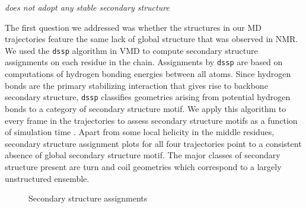 {\it \gct{} does not adopt any stable secondary structure}

The first question we addressed was whether the structures in our MD trajectories feature the same lack of global structure that was observed in NMR. We used the \texttt{dssp} algorithm  in VMD to compute secondary structure assignments on each residue in the chain. Assignments by \texttt{dssp} are based on computations of hydrogen bonding energies between all atoms. Since hydrogen bonds are the primary stabilizing interaction that gives rise to backbone secondary structure, \texttt{dssp} classifies geometries arising from potential hydrogen bonds to a category of secondary structure motif. We apply this algorithm to every frame in the trajectories to assess secondary structure motifs as a function of simulation time . Apart from some local helicity in the middle residues, secondary structure assignment plots for all four trajectories point to a consistent absence of global secondary structure motif. The major classes of secondary structure present are turn and coil geometries which correspond to a largely unstructured ensemble. 

\begin{figure}
	\centering     %
	\caption{Secondary structure assignments}
\end{figure}	
	
